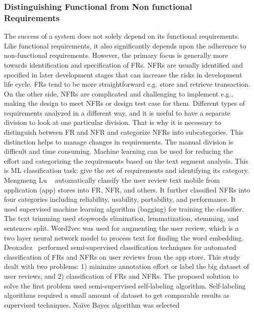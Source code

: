 \subsubsection{Distinguishing Functional from Non functional Requirements} 
The success of a system does not solely depend on its functional requirements.
Like functional requirements, it also significantly depends upon the adherence
to non-functional requirements. However, the primary focus is generally more
towards identification and specification of FRs. NFRs are usually identified and
specified in later development stages that can increase the risks in development
life cycle. FRs tend to be more straightforward e.g. store and retrieve
transaction. On the other side, NFRs are complicated and challenging to
implement e.g., making the design to meet NFRs or design test case for them.
Different types of requirements analyzed in a different way, and it is useful to
have a separate division to look at one particular division. That is why it is
necessary to distinguish between FR and NFR and categorize NFRs into
subcategories. This distinction helps to manage changes in requirements. The
manual division is difficult and time consuming. Machine learning can be used
for reducing the effort and categorizing the requirements based on the text
segment analysis. This is ML classification task: give the set of requirements
and identifying its category.\\
Mengmeng Lu \etal~ \cite{Lu:2017} automatically classify the user review text
mobile from application (app) stores  into FR, NFR, and others. It further
classified NFRs into four categories including reliability, usability,
portability, and performance. It used supervised machine learning algorithm
(bagging) for training the classifier. The text trimming used stopwords
elimination, lemmatization, stemming, and sentences split. Word2vec was used for augmenting the user review, which is a two layer
neural network model to process text for finding the word embedding. Deoxadez
\etal~\cite{Deocadez:2017}performed semi-supervised classification techniques
for automated classification of FRs and NFRs on user reviews from the app store.
This study dealt with two problems: 1) minimize annotation effort or label the
big dataset of user reviews, and 2) classification of FRs and NFRs. The proposed
solution to solve the first problem used semi-supervised self-labeling
algorithm. Self-labeling algorithms required a small amount of dataset to get
comparable results as supervised techniques. Naïve Bayes algorithm was selected
